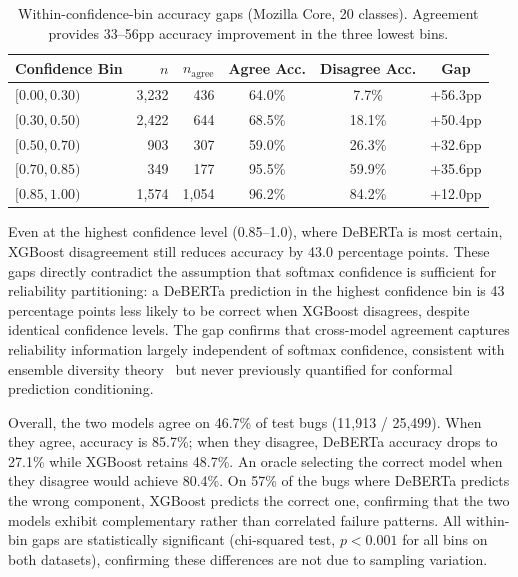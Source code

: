 \documentclass[conference]{IEEEtran}
\newcommand{\pp}{\text{pp}}
\begin{document}
\begin{table}[t]
\caption{Within-confidence-bin accuracy gaps (Mozilla Core, 20 classes). Agreement provides 33--56$\pp$ accuracy improvement in the three lowest bins.}
\label{tab:agreement-gaps-mozilla}
\centering
\footnotesize
\setlength{\tabcolsep}{3.5pt}
\begin{tabular}{@{}lrrccc@{}}
\toprule
\textbf{Confidence Bin} & $n$ & $n_\text{agree}$ & \textbf{Agree Acc.} & \textbf{Disagree Acc.} & \textbf{Gap} \\
\midrule
$[0.00, 0.30)$ & 3{,}232 & 436   & 64.0\% & 7.7\%  & +56.3$\pp$ \\
$[0.30, 0.50)$ & 2{,}422 & 644   & 68.5\% & 18.1\% & +50.4$\pp$ \\
$[0.50, 0.70)$ & 903     & 307   & 59.0\% & 26.3\% & +32.6$\pp$ \\
$[0.70, 0.85)$ & 349     & 177   & 95.5\% & 59.9\% & +35.6$\pp$ \\
$[0.85, 1.00)$ & 1{,}574 & 1{,}054 & 96.2\% & 84.2\% & +12.0$\pp$ \\
\bottomrule
\end{tabular}
\end{table}

Even at the highest confidence level (0.85--1.0), where DeBERTa is most certain, XGBoost disagreement still reduces accuracy by 43.0 percentage points. These gaps directly contradict the assumption that softmax confidence is sufficient for reliability partitioning: a DeBERTa prediction in the highest confidence bin is 43 percentage points less likely to be correct when XGBoost disagrees, despite identical confidence levels. The gap confirms that cross-model agreement captures reliability information largely independent of softmax confidence, consistent with ensemble diversity theory~\cite{kuncheva2003measures,dietterich2000ensemble} but never previously quantified for conformal prediction conditioning.

Overall, the two models agree on 46.7\% of test bugs (11,913 / 25,499). When they agree, accuracy is 85.7\%; when they disagree, DeBERTa accuracy drops to 27.1\% while XGBoost retains 48.7\%. An oracle selecting the correct model when they disagree would achieve 80.4\%. On 57\% of the bugs where DeBERTa predicts the wrong component, XGBoost predicts the correct one, confirming that the two models exhibit complementary rather than correlated failure patterns. All within-bin gaps are statistically significant (chi-squared test, $p < 0.001$ for all bins on both datasets), confirming these differences are not due to sampling variation.
\end{document}
